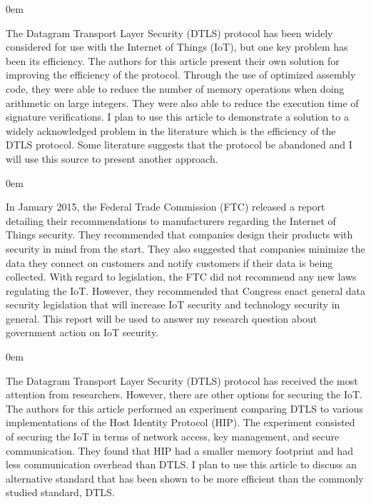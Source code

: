 \documentclass{article}
\newenvironment{annotation}{\begin{addmargin}[2.5em]{0em} \begin{flushleft}}{\end{flushleft} \end{addmargin}}
\begin{document}
\begin{annotation}
The Datagram Transport Layer Security (DTLS) protocol has been widely considered for use with the Internet of Things (IoT), but one key problem has been its efficiency. The authors for this article present their
own solution for improving the efficiency of the protocol. Through the use of optimized assembly code, they were able to reduce the number of memory operations when doing arithmetic on large
integers. They were also able to reduce the execution time of signature verifications. I plan to use this article to demonstrate a solution to a widely acknowledged problem in the literature which
is the efficiency of the DTLS protocol. Some literature suggests that the protocol be abandoned and I will use this source to present another approach. 
\end{annotation}

\begin{annotation}
In January 2015, the Federal Trade Commission (FTC) released a report detailing their recommendations to manufacturers regarding the Internet of Things security. They recommended that companies design their
products with security in mind from the start. They also suggested that companies minimize the data they connect on customers and notify customers if their data is being collected. With regard to 
legislation, the FTC did not recommend any new laws regulating the IoT. However, they recommended that Congress enact general data security legislation that will increase IoT security and technology 
security in general. This report will be used to answer my research question about government action on IoT security.
\end{annotation}

\begin{annotation}
The Datagram Transport Layer Security (DTLS) protocol has received the most attention from researchers. However, there are other options for securing the IoT. The authors for this article performed an 
experiment comparing DTLS to various implementations of the Host Identity Protocol (HIP). The experiment consisted of securing the IoT in terms of network access, key management, and secure communication.
They found that HIP had a smaller memory footprint and had less communication overhead than DTLS. I plan to use this article to discuss an alternative standard that has been shown to be more efficient
than the commonly studied standard, DTLS.
\end{annotation}
\end{document}
